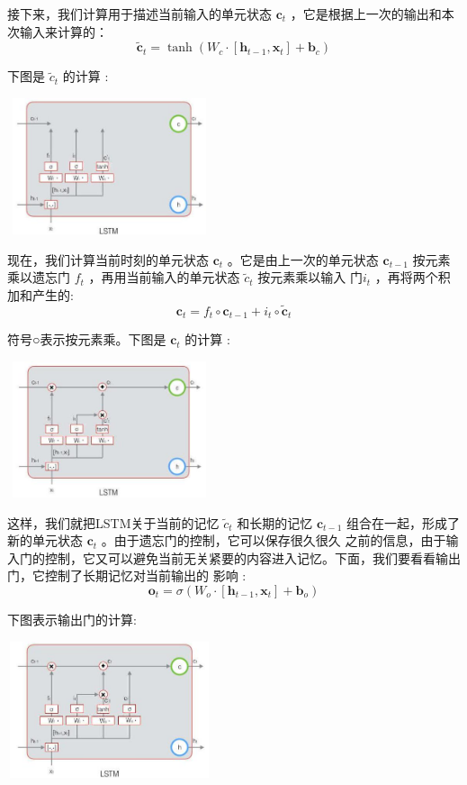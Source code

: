 \documentclass[10.5pt,compsoc]{CjC}
\theoremstyle{mystyle}
\begin{document}
接下来，我们计算用于描述当前输入的单元状态 $\boldsymbol{c}_{t}$ ，它是根据上一次的输出和本次输入来计算的：
$$
\tilde{\mathbf{c}}_{t}=\tanh \left(W_{c} \cdot\left[\mathbf{h}_{t-1}, \mathbf{x}_{t}\right]+\mathbf{b}_{c}\right)
$$

下图是 $\tilde{c}_{t}$ 的计算 :

\includegraphics[width=6cm, height=4cm]{images/2022_05_03_e4231fc9c1842f38b0acg-04(1)}

现在，我们计算当前时刻的单元状态 $\mathbf{c}_{t}$ 。它是由上一次的单元状态 $\mathbf{c}_{t-1}$ 按元素乘以遗忘门 $f_{t}$ ，再用当前输入的单元状态 $\tilde{c}_{t}$ 按元素乘以输入 $门 i_{t}$ ，再将两个积加和产生的:
$$
\mathbf{c}_{t}=f_{t} \circ \mathbf{c}_{t-1}+i_{t} \circ \tilde{\mathbf{c}}_{t}
$$

符号○表示按元素乘。下图是 $\mathbf{c}_{t}$ 的计算 :

\includegraphics[width=6cm, height=4cm]{images/2022_05_03_e4231fc9c1842f38b0acg-04(2)}

这样，我们就把LSTM关于当前的记忆 $\tilde{c}_{t}$ 和长期的记忆 $\mathbf{c}_{t-1}$ 组合在一起，形成了新的单元状态 $\mathbf{c}_{t}$ 。由于遗忘门的控制，它可以保存很久很久 之前的信息，由于输入门的控制，它又可以避免当前无关紧要的内容进入记忆。下面，我们要看看输出门，它控制了长期记忆对当前输出的 影响 :
$$
\mathbf{o}_{t}=\sigma\left(W_{o} \cdot\left[\mathbf{h}_{t-1}, \mathbf{x}_{t}\right]+\mathbf{b}_{o}\right)
$$

下图表示输出门的计算:

\includegraphics[width=6cm, height=4cm]{images/2022_05_03_e4231fc9c1842f38b0acg-05}
\end{document}
